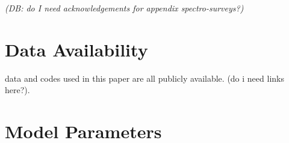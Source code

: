 \documentclass[fleqn,
usenatbib]{mnras}
\newcommand{\dbadd}[1]{{\color{Thistle} #1}}
\newcommand{\dbnote}[1]{ {\color{Thistle} \textit{\small (DB: #1)}} }
\begin{document}
\dbnote{do I need acknowledgements for appendix spectro-surveys?}

\section*{Data Availability}

\dbadd{data and codes used in this paper are all publicly available. (do i need links here?). }







\appendix

\section{Model Parameters}
\end{document}
